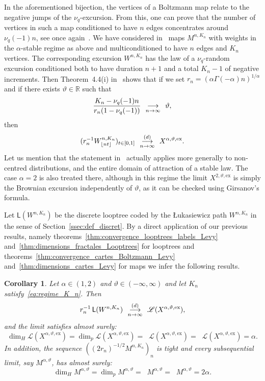 \documentclass[british, a4paper,11pt]{article}
\numberwithin{equation}{section}
\newtheorem{cor}[thm]{Corollary}
\theoremstyle{definition}
\newcommand{\R}{\mathbb{R}}
\newcommand{\Loop}{\mathscr{L}}
\newcommand{\Loopd}{\mathsf{L}}
\newcommand{\Map}{M}
\DeclareMathOperator{\diminf}{\underline{\dim}}%
\DeclareMathOperator{\dimsup}{\overline{\dim}}%
\newcommand{\cv}[1][n]{\enskip\mathop{\longrightarrow}^{}_{#1 \to \infty}\enskip}
\newcommand{\cvloi}[1][n]{\enskip\mathop{\longrightarrow}^{(d)}_{#1 \to \infty}\enskip}
\newcommand{\exc}{\mathrm{ex}}
\DeclarePairedDelimiter\floor{\lfloor}{\rfloor}
\begin{document}
In the aforementioned bijection, the vertices of a Boltzmann map relate to the negative jumps of the $\nu_q$-excursion. From this, one can prove that the number of vertices in such a map conditioned to have $n$ edges concentrates around $\nu_q(-1) n$, see once again~\cite[Section~6.4]{Mar19}.
We have considered in~\cite{KM23} maps $M^{n,K_n}$ with weights in the $\alpha$-stable regime as above and multiconditioned to have $n$ edges and $K_n$ vertices. 
The corresponding excursion $W^{n,K_n}$ has the law of a $\nu_q$-random excursion conditioned both to have duration $n+1$ and a total $K_n-1$ of negative increments.
Then Theorem~4.4(i) in~\cite{KM23} shows that if we set $r_n = (\alpha \Gamma(-\alpha) n)^{1/\alpha}$ and if there exists $\vartheta \in \R$ such that
\begin{equation}\label{eq:regime_K_n}
\frac{K_n - \nu_q(-1) n}{r_n (1-\nu_q(-1))} \cv \vartheta
,\end{equation}
then
\begin{equation}\label{eq:CVluka_distorted}
(r_n^{-1} W^{n,K_n}_{\floor{nt}})_{t \in [0,1]} \cvloi X^{\alpha,\vartheta,\exc}
.\end{equation}
Let us mention that the statement in~\cite{KM23} actually applies more generally to non-centred distributions, and the entire domain of attraction of a stable law.
The case $\alpha=2$ is also treated there, although in this regime the limit $X^{2,\vartheta,\exc}$ is simply the Brownian excursion independently of $\vartheta$, as it can be checked using Girsanov's formula.



Let $\Loopd(W^{n,K_n})$ be the discrete looptree coded by the {\L}ukasiewicz path $W^{n,K_n}$ in the sense of Section~\ref{ssec:def_discret}.
By a direct application of our previous results, namely theorems~\ref{thm:convergence_looptrees_labels_Levy} and~\ref{thm:dimensions_fractales_Looptrees} for looptrees and theorems~\ref{thm:convergence_cartes_Boltzmann_Levy} and~\ref{thm:dimensions_cartes_Levy} for maps we infer the following results.


\begin{cor}\label{cor:looptrees_maps_stable_drift}
Let $\alpha \in (1,2)$ and $\vartheta \in (-\infty, \infty)$ and let $K_n$ satisfy~\eqref{eq:regime_K_n}. Then
\[r_{n}^{-1}\, \Loopd(W^{n,K_n}) \cvloi \Loop(X^{\alpha, \vartheta, \exc}),\]
and the limit satisfies almost surely:
\[\dim_{H} \Loop(X^{\alpha, \vartheta, \exc}) = \dim_{p} \Loop(X^{\alpha, \vartheta, \exc}) = \diminf \Loop(X^{\alpha, \vartheta, \exc}) = \dimsup \Loop(X^{\alpha, \vartheta, \exc}) = \alpha.\]
In addition, the sequence $((2r_{n})^{-1/2} M^{n,K_n})_n$ is tight and every subsequential limit, say $\Map^{\alpha, \vartheta}$, has almost surely:
\[\dim_{H} \Map^{\alpha, \vartheta} = \dim_{p} \Map^{\alpha, \vartheta} = \diminf \Map^{\alpha, \vartheta} = \dimsup \Map^{\alpha, \vartheta} = 2\alpha.\]
\end{cor}
\end{document}
